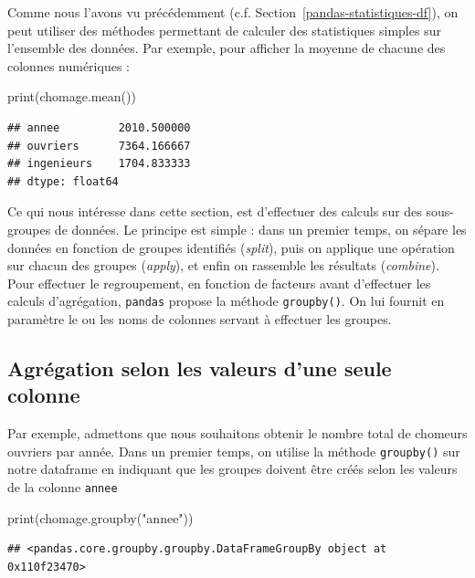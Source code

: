 \documentclass[12pt,]{book}
\newenvironment{Shaded}{\begin{snugshade}}{\end{snugshade}}
\newcommand{\StringTok}[1]{\textcolor[rgb]{0.31,0.60,0.02}{#1}}
\newcommand{\BuiltInTok}[1]{#1}
\newcommand{\NormalTok}[1]{#1}
\numberwithin{equation}{section}
\numberwithin{countremarque}{section}
\begin{document}
Comme nous l'avons vu précédemment (c.f.
Section~\ref{pandas-statistiques-df}), on peut utiliser des méthodes
permettant de calculer des statistiques simples sur l'ensemble des
données. Par exemple, pour afficher la moyenne de chacune des colonnes
numériques :

\begin{Shaded}
\begin{Highlighting}[]
\BuiltInTok{print}\NormalTok{(chomage.mean())}
\end{Highlighting}
\end{Shaded}

\begin{lstlisting}
## annee         2010.500000
## ouvriers      7364.166667
## ingenieurs    1704.833333
## dtype: float64
\end{lstlisting}

Ce qui nous intéresse dans cette section, est d'effectuer des calculs
sur des sous-groupes de données. Le principe est simple : dans un
premier temps, on sépare les données en fonction de groupes identifiés
(\emph{split}), puis on applique une opération sur chacun des groupes
(\emph{apply}), et enfin on rassemble les résultats (\emph{combine}).
Pour effectuer le regroupement, en fonction de facteurs avant
d'effectuer les calculs d'agrégation, \texttt{pandas} propose la méthode
\texttt{groupby()}. On lui fournit en paramètre le ou les noms de
colonnes servant à effectuer les groupes.

\subsection{Agrégation selon les valeurs d'une seule
colonne}\label{agregation-selon-les-valeurs-dune-seule-colonne}

Par exemple, admettons que nous souhaitons obtenir le nombre total de
chomeurs ouvriers par année. Dans un premier temps, on utilise la
méthode \texttt{groupby()} sur notre dataframe en indiquant que les
groupes doivent être créés selon les valeurs de la colonne
\texttt{annee}

\begin{Shaded}
\begin{Highlighting}[]
\BuiltInTok{print}\NormalTok{(chomage.groupby(}\StringTok{"annee"}\NormalTok{))}
\end{Highlighting}
\end{Shaded}

\begin{lstlisting}
## <pandas.core.groupby.groupby.DataFrameGroupBy object at 0x110f23470>
\end{lstlisting}
\end{document}
